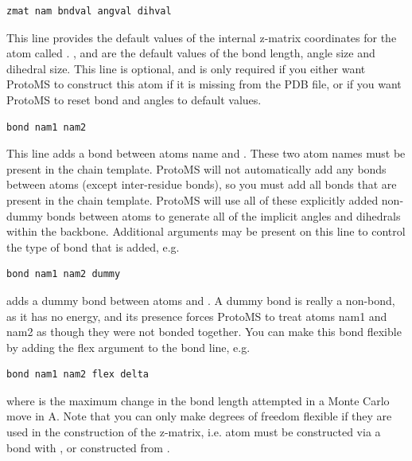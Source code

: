 \documentclass[letterpaper,10pt,english]{sphinxmanual}
\begin{document}
\begin{Verbatim}[commandchars=\\\{\}]
zmat nam bndval angval dihval
\end{Verbatim}

This line provides the default values of the internal z-matrix coordinates for the atom called . ,  and  are the default values of the bond length, angle size and dihedral size. This line is optional, and is only required if you either want ProtoMS to construct this atom if it is missing from the PDB file, or if you want ProtoMS to reset bond and angles to default values.

\begin{Verbatim}[commandchars=\\\{\}]
bond nam1 nam2
\end{Verbatim}

This line adds a bond between atoms name  and . These two atom names must be present in the chain template. ProtoMS will not automatically add any bonds between atoms (except inter-residue bonds), so you must add all bonds that are present in the chain template. ProtoMS will use all of these explicitly added non-dummy bonds between atoms to generate all of the implicit angles and dihedrals within the backbone. Additional arguments may be present on this line to control the type of bond that is added, e.g.

\begin{Verbatim}[commandchars=\\\{\}]
bond nam1 nam2 dummy
\end{Verbatim}

adds a dummy bond between atoms  and . A dummy bond is really a non-bond, as it has no energy, and its presence forces ProtoMS to treat atoms nam1 and nam2 as though they were not bonded together. You can make this bond flexible by adding the flex argument to the bond line, e.g.

\begin{Verbatim}[commandchars=\\\{\}]
bond nam1 nam2 flex delta
\end{Verbatim}

where  is the maximum change in the bond length attempted in a Monte Carlo move in A. Note that you can only make degrees of freedom flexible if they are used in the construction of the z-matrix, i.e. atom  must be constructed via a bond with , or  constructed from .
\end{document}
